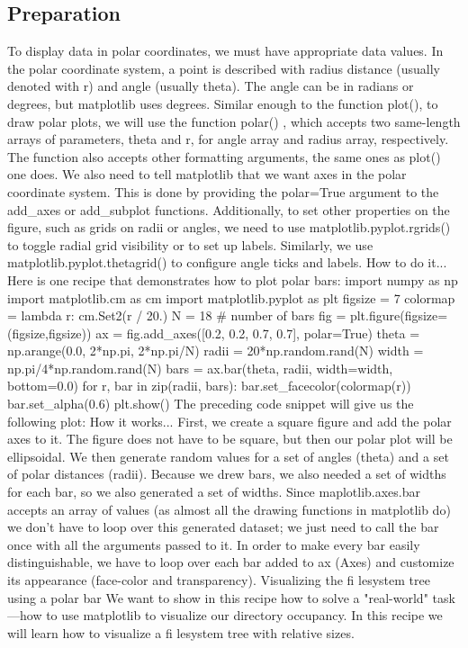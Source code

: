 \subsection{Preparation}
To display data in polar coordinates, we must have appropriate data values. In the polar
coordinate system, a point is described with radius distance (usually denoted with r) and
angle (usually theta). The angle can be in radians or degrees, but matplotlib uses degrees.
Similar enough to the function plot(), to draw polar plots, we will use the function polar() ,
which accepts two same-length arrays of parameters, theta and r, for angle array and radius
array, respectively. The function also accepts other formatting arguments, the same ones as
plot() one does.
We also need to tell matplotlib that we want axes in the polar coordinate system. This is done
by providing the polar=True argument to the add_axes or add_subplot functions.
Additionally, to set other properties on the figure, such as grids on radii or angles, we need
to use matplotlib.pyplot.rgrids() to toggle radial grid visibility or to set up labels.
Similarly, we use matplotlib.pyplot.thetagrid() to configure angle ticks and labels.
How to do it...
Here is one recipe that demonstrates how to plot polar bars:
import numpy as np
import matplotlib.cm as cm
import matplotlib.pyplot as plt
figsize = 7
colormap = lambda r: cm.Set2(r / 20.)
N = 18 # number of bars
fig = plt.figure(figsize=(figsize,figsize))
ax = fig.add_axes([0.2, 0.2, 0.7, 0.7], polar=True)
theta = np.arange(0.0, 2*np.pi, 2*np.pi/N)
radii = 20*np.random.rand(N)
width = np.pi/4*np.random.rand(N)
bars = ax.bar(theta, radii, width=width, bottom=0.0)
for r, bar in zip(radii, bars):
 bar.set_facecolor(colormap(r))
 bar.set_alpha(0.6)
plt.show()
The preceding code snippet will give us the following plot:
How it works...
First, we create a square figure and add the polar axes to it. The figure does not have to be
square, but then our polar plot will be ellipsoidal.
We then generate random values for a set of angles (theta) and a set of polar distances
(radii). Because we drew bars, we also needed a set of widths for each bar, so we also
generated a set of widths. Since maplotlib.axes.bar accepts an array of values
(as almost all the drawing functions in matplotlib do) we don't have to loop over this
generated dataset; we just need to call the bar once with all the arguments passed to it.
In order to make every bar easily distinguishable, we have to loop over each bar added to ax
(Axes) and customize its appearance (face-color and transparency).
Visualizing the fi lesystem tree using a
polar bar
We want to show in this recipe how to solve a "real-world" task—how to use matplotlib to
visualize our directory occupancy.
In this recipe we will learn how to visualize a fi lesystem tree with relative sizes.
